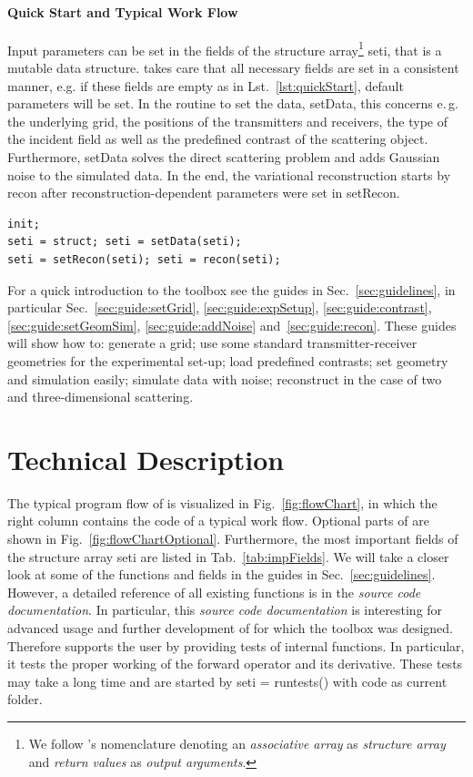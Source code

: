 \documentclass[a4paper]{article}
\begin{document}
\paragraph{Quick Start and Typical Work Flow} Input parameters can be set in the fields of the structure array\footnote{We follow \MATLAB's nomenclature denoting an \emph{associative array} as \emph{structure array} and \emph{return values} as \emph{output arguments}.} \textsf{seti}, that is a mutable data structure. \IPscatt takes care that all necessary fields are set in a consistent manner, e.g. if these fields are empty as in Lst.~\ref{lst:quickStart}, default parameters will be set. In the routine to set the data, \textsf{setData}, this concerns e.\,g. the underlying grid, the positions of the transmitters and receivers, the type of the incident field as well as the predefined contrast of the scattering object. Furthermore, \textsf{setData} solves the direct scattering problem and adds Gaussian noise to the simulated data. In the end, the variational reconstruction starts by \textsf{recon} after reconstruction-dependent parameters were set in \textsf{setRecon}.
\begin{lstlisting}[caption={Quick Start Example.},label=lst:quickStart]
init;
seti = struct; seti = setData(seti);
seti = setRecon(seti); seti = recon(seti);
\end{lstlisting}

For a quick introduction to the toolbox \IPscatt see the guides in Sec.~\ref{sec:guidelines}, in particular Sec.~\ref{sec:guide:setGrid}, \ref{sec:guide:expSetup}, \ref{sec:guide:contrast}, \ref{sec:guide:setGeomSim}, \ref{sec:guide:addNoise} and~\ref{sec:guide:recon}. These guides will show how to: generate a grid; use some standard transmitter-receiver geometries for the experimental set-up; 
load predefined contrasts; 
set geometry and simulation easily; 
simulate data with noise; 
reconstruct in the case of two and three-dimensional scattering.


\section{Technical Description}\label{sec:tech}

The typical program flow of \IPscatt is visualized in Fig.~\ref{fig:flowChart}, in which the right column contains the code of a typical work flow. Optional parts of \IPscatt are shown in Fig.~\ref{fig:flowChartOptional}. Furthermore, the most important fields of the structure array \textsf{seti} are listed in Tab.~\ref{tab:impFields}. We will take a closer look at some of the functions and fields in the guides in Sec.~\ref{sec:guidelines}. However, a detailed reference of all existing functions is in the \emph{source code documentation}.
%
In particular, this \emph{source code documentation} is interesting for advanced usage and further development of \IPscatt for which the toolbox was designed. Therefore \IPscatt supports the user by providing tests of internal functions. In particular, it tests the proper working of the forward operator and its derivative. These tests may take a long time and are started by \textsf{seti = runtests()} with \textsf{code} as current folder.
\end{document}

